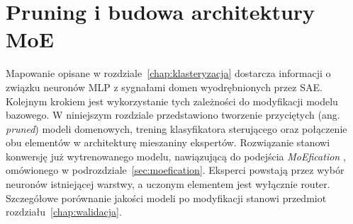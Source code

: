 





\chapter{Pruning i budowa architektury MoE}
\label{chap:pruning_moe}
Mapowanie opisane w rozdziale~\ref{chap:klasteryzacja} dostarcza informacji o związku neuronów MLP z sygnałami domen wyodrębnionych przez SAE. Kolejnym krokiem jest wykorzystanie tych zależności do modyfikacji modelu bazowego. W niniejszym rozdziale przedstawiono tworzenie przyciętych (ang. \textit{pruned}) modeli domenowych, trening klasyfikatora sterującego oraz połączenie obu elementów w architekturę mieszaniny ekspertów. Rozwiązanie stanowi konwersję już wytrenowanego modelu, nawiązującą do podejścia \textit{MoEfication} \cite{zhang_2022_moefication}, omówionego w podrozdziale~\ref{sec:moefication}. Eksperci powstają przez wybór neuronów istniejącej warstwy, a uczonym elementem jest wyłącznie router. Szczegółowe porównanie jakości modeli po modyfikacji stanowi przedmiot rozdziału~\ref{chap:walidacja}.

